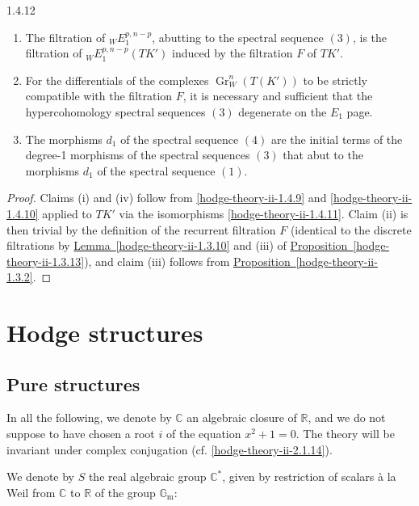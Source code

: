 \begin{lemma}{1.4.12}
\begin{enumerate}
      
 \item[(ii)]
        The filtration of \({}_WE_1^{p,n-p}\), abutting to the spectral sequence \((3)\), is the filtration of \({}_WE_1^{p,n-p}(TK')\) induced by the filtration \(F\) of \(TK'\).
      


      
 \item[(iii)]
        For the differentials of the complexes \(\operatorname {Gr}_W^n(T(K'))\) to be strictly compatible with the filtration \(F\), it is necessary and sufficient that the hypercohomology spectral sequences \((3)\) degenerate on the \(E_1\) page.
      


      
 \item[(iv)]
        The morphisms \(d_1\) of the spectral sequence \((4)\) are the initial terms of the degree-1 morphisms of the spectral sequences \((3)\) that abut to the morphisms \(d_1\) of the spectral sequence \((1)\).
      

    \end{enumerate}\begin{proof}\par{}Claims (i) and (iv) follow from \cref{hodge-theory-ii-1.4.9} and \cref{hodge-theory-ii-1.4.10} applied to \(TK'\) via the isomorphisms \cref{hodge-theory-ii-1.4.11}.
      Claim (ii) is then trivial by the definition of the recurrent filtration \(F\) (identical to the discrete filtrations by \hyperref[hodge-theory-ii-1.3.10]{Lemma~\ref*{hodge-theory-ii-1.3.10}} and (iii) of \hyperref[hodge-theory-ii-1.3.13]{Proposition~\ref*{hodge-theory-ii-1.3.13}}), and claim (iii) follows from \hyperref[hodge-theory-ii-1.3.2]{Proposition~\ref*{hodge-theory-ii-1.3.2}}.\end{proof}\end{lemma}\chapter{Hodge structures}\thispagestyle{fancy}\label{hodge-theory-ii-2}\section{Pure structures}\label{hodge-theory-ii-2.1}\label{hodge-theory-ii-2.1.1}\par{}In all the following, we denote by \(\mathbb {C}\) an algebraic closure of \(\mathbb {R}\), and we do not suppose to have chosen a root \(i\) of the equation \(x^2+1=0\).
    The theory will be invariant under complex conjugation (cf. \cref{hodge-theory-ii-2.1.14}).\label{hodge-theory-ii-2.1.2}\par{}We denote by \(S\) the real algebraic group \(\mathbb {C}^*\), given by restriction of scalars à la Weil from \(\mathbb {C}\) to \(\mathbb {R}\) of the group \(\mathbb {G}_\mathrm {m}\):
